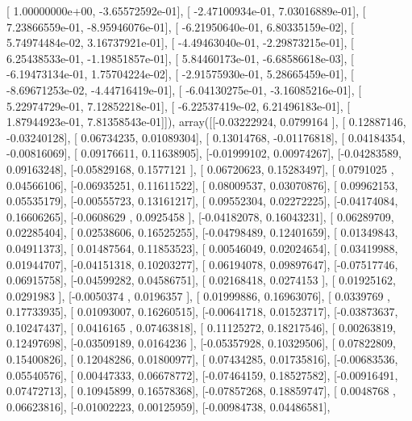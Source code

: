 \documentclass{article}
\begin{document}
       [  1.00000000e+00,  -3.65572592e-01],
       [ -2.47100934e-01,   7.03016889e-01],
       [  7.23866559e-01,  -8.95946076e-01],
       [ -6.21950640e-01,   6.80335159e-02],
       [  5.74974484e-02,   3.16737921e-01],
       [ -4.49463040e-01,  -2.29873215e-01],
       [  6.25438533e-01,  -1.19851857e-01],
       [  5.84460173e-01,  -6.68586618e-03],
       [ -6.19473134e-01,   1.75704224e-02],
       [ -2.91575930e-01,   5.28665459e-01],
       [ -8.69671253e-02,  -4.44716419e-01],
       [ -6.04130275e-01,  -3.16085216e-01],
       [  5.22974729e-01,   7.12852218e-01],
       [ -6.22537419e-02,   6.21496183e-01],
       [  1.87944923e-01,   7.81358543e-01]]), array([[-0.03222924,  0.0799164 ],
       [ 0.12887146, -0.03240128],
       [ 0.06734235,  0.01089304],
       [ 0.13014768, -0.01176818],
       [ 0.04184354, -0.00816069],
       [ 0.09176611,  0.11638905],
       [-0.01999102,  0.00974267],
       [-0.04283589,  0.09163248],
       [-0.05829168,  0.1577121 ],
       [ 0.06720623,  0.15283497],
       [ 0.0791025 ,  0.04566106],
       [-0.06935251,  0.11611522],
       [ 0.08009537,  0.03070876],
       [ 0.09962153,  0.05535179],
       [-0.00555723,  0.13161217],
       [ 0.09552304,  0.02272225],
       [-0.04174084,  0.16606265],
       [-0.0608629 ,  0.0925458 ],
       [-0.04182078,  0.16043231],
       [ 0.06289709,  0.02285404],
       [ 0.02538606,  0.16525255],
       [-0.04798489,  0.12401659],
       [ 0.01349843,  0.04911373],
       [ 0.01487564,  0.11853523],
       [ 0.00546049,  0.02024654],
       [ 0.03419988,  0.01944707],
       [-0.04151318,  0.10203277],
       [ 0.06194078,  0.09897647],
       [-0.07517746,  0.06915758],
       [-0.04599282,  0.04586751],
       [ 0.02168418,  0.0274153 ],
       [ 0.01925162,  0.0291983 ],
       [-0.0050374 ,  0.0196357 ],
       [ 0.01999886,  0.16963076],
       [ 0.0339769 ,  0.17733935],
       [ 0.01093007,  0.16260515],
       [-0.00641718,  0.01523717],
       [-0.03873637,  0.10247437],
       [ 0.0416165 ,  0.07463818],
       [ 0.11125272,  0.18217546],
       [ 0.00263819,  0.12497698],
       [-0.03509189,  0.0164236 ],
       [-0.05357928,  0.10329506],
       [ 0.07822809,  0.15400826],
       [ 0.12048286,  0.01800977],
       [ 0.07434285,  0.01735816],
       [-0.00683536,  0.05540576],
       [ 0.00447333,  0.06678772],
       [-0.07464159,  0.18527582],
       [-0.00916491,  0.07472713],
       [ 0.10945899,  0.16578368],
       [-0.07857268,  0.18859747],
       [ 0.0048768 ,  0.06623816],
       [-0.01002223,  0.00125959],
       [-0.00984738,  0.04486581],
\end{document}
